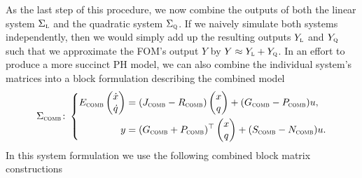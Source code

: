 As the last step of this procedure, we now combine the outputs of both the linear system $\Sigma_{\textnormal{\scshape l}}$ and the quadratic system $\Sigma_{\textnormal{\scshape q}}$.
If we naively simulate both systems independently, then we would simply add up the resulting outputs $Y_{\textnormal{\scshape l}}$ and $Y_{\textnormal{\scshape q}}$ such that we approximate the \ac{FOM}'s output $Y$ by $Y \approx Y_{\textnormal{\scshape l}} + Y_{\textnormal{\scshape q}}$.
In an effort to produce a more succinct \ac{PH} model, we can also combine the individual system's matrices into a block formulation describing the combined model
\begin{equation}\label{eq:quad-state-system-coupling}
    \Sigma_{\textnormal{\scshape comb}} \colon \left\lbrace
    \begin{aligned}
        E_{\textnormal{\scshape comb}} \begin{pmatrix}
            \dot{x} \\
            \dot{q}
        \end{pmatrix} &= (J_{\textnormal{\scshape comb}} - R_{\textnormal{\scshape comb}}) \begin{pmatrix}
            x \\
            q
        \end{pmatrix} + (G_{\textnormal{\scshape comb}} - P_{\textnormal{\scshape comb}}) u, \\
        y &= (G_{\textnormal{\scshape comb}} + P_{\textnormal{\scshape comb}})^{\top} \begin{pmatrix}
            x \\
            q
        \end{pmatrix} + (S_{\textnormal{\scshape comb}} - N_{\textnormal{\scshape comb}}) u.
    \end{aligned}
    \right.
\end{equation}
In this system formulation we use the following combined block matrix constructions
